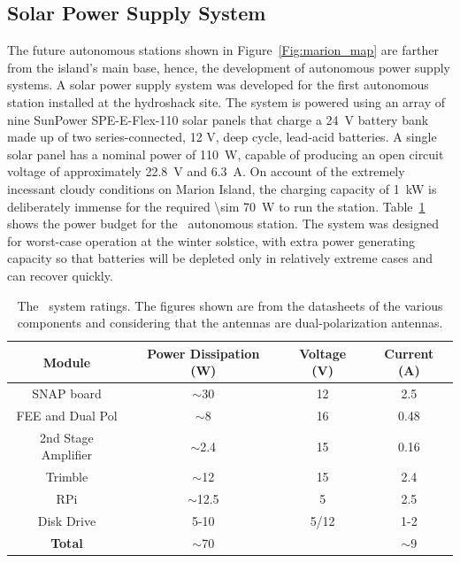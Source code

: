 \subsection{Solar Power Supply System}

The future autonomous stations shown in Figure~\ref{Fig:marion_map} are farther from the island's main base, hence, the development of autonomous power supply systems. A solar power supply system was developed for the first autonomous station installed at the hydroshack site. The system is powered using an array of nine SunPower SPE-E-Flex-110 solar panels that charge a \SI{24}{\volt} battery bank made up of two series-connected, 12 V, deep cycle, lead-acid batteries. A single solar panel has a nominal power of \SI{110}{\watt}, capable of producing an open circuit voltage of approximately \SI{22.8}{\volt} and \SI{6.3}{\ampere}. On account of the extremely incessant cloudy conditions on Marion Island, the charging capacity of \SI{1}{\kilo\watt} is deliberately immense for the required \SI{\sim 70}{\watt} to run the station. Table~\ref{Table:budget2} shows the power budget for the \albatros\ autonomous station. The system was designed for worst-case operation at the winter solstice, with extra power generating capacity so that batteries will be depleted only in relatively extreme cases and can recover quickly. 

\begin{table}
	\centering
	\begin{tabular}{|c | c | c | c |} 
		\hline
		Module & Power Dissipation (W) &  Voltage (V) & Current (A)\\  
		\hline
		SNAP board & $\sim$30 & 12 & 2.5\\
		\hline
		FEE and Dual Pol & $\sim$8 & 16 & 0.48 \\
		\hline
		2nd Stage Amplifier & $\sim$2.4 & 15 & 0.16\\
		\hline
		Trimble & $\sim$12 & 15 & 2.4\\
		\hline
		RPi & $\sim$12.5 & 5 & 2.5 \\
		\hline
		Disk Drive & 5-10 & 5/12 & 1-2 \\
		\hline
		\textbf{Total} & $\sim$70 &  & $\sim$9 \\
		\hline
	\end{tabular}
	\caption{The \albatros\ system ratings. The figures shown are from the datasheets of the various components and considering that the antennas are dual-polarization antennas.}
	\label{Table:budget2}
\end{table}

